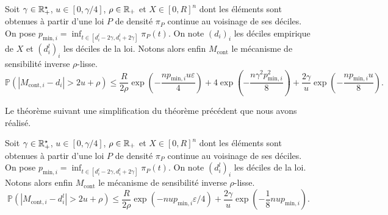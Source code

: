 \begin{theorem}
    Soit \(\gamma \in \mathbb{R}_+^\star\), \(u \in [0, \gamma/4]\), \(\rho \in \mathbb{R}_+\) et \(X \in [0,R]^n\) dont les éléments sont obtenues à partir d'une loi \(P\) de densité \(\pi_P\) continue au voisinage de ses déciles. On pose \(p_{\text{min}, i} = \inf_{t \in [d_i^l - 2\gamma, d_i^l + 2\gamma]} \pi_P(t)\). On note \((d_i)_i\) les déciles empirique de \(X\) et \((d_i^l)_i\) les déciles de la loi. Notons alors enfin \(M_{\text{cont}}\) le mécanisme de sensibilité inverse \(\rho\)-lisse.
    \[
        \mathbb P\left( |M_{\text{cont}, i} - d_i| > 2u + \rho\right) \leq \dfrac{R}{2\rho}\exp\left(- \dfrac{np_{\text{min}, i}u\varepsilon}{4} \right) + 4\exp\left(- \dfrac{n\gamma^2p_{\text{min},i}^2}{8} \right) + \dfrac{2\gamma}{u}\exp\left( -\dfrac{np_{\text{min},i}u}{8} \right).
    \]
\end{theorem}


Le théorème suivant une simplification du théorème précédent que nous avons réalisé.\\

\begin{theorem}
    \label{EDE}
    Soit \(\gamma \in \mathbb{R}_+^\star\), \(u \in [0, \gamma/4]\), \(\rho \in \mathbb{R}_+\) et \(X \in [0,R]^n\) dont les éléments sont obtenues à partir d'une loi \(P\) de densité \(\pi_P\) continue au voisinage de ses déciles. On pose \(p_{\text{min}, i} = \inf_{t \in [d_i^l - 2\gamma, d_i^l + 2\gamma]} \pi_P(t)\). On note \((d_i^l)_i\) les déciles de la loi. Notons alors enfin \(M_{\text{cont}}\) le mécanisme de sensibilité inverse \(\rho\)-lisse.
    \[
        \mathbb P\left( |M_{\text{cont}, i} - d_i^l| > 2u + \rho \right) \leq  \dfrac{R}{2\rho}\exp\left( -{nup_{\text{min}, i}\varepsilon}/{4} \right) + \dfrac{2\gamma}{u}\exp\left( - \dfrac{1}{8}n u p_{\text{min}, i} \right). 
    \]
\end{theorem}

